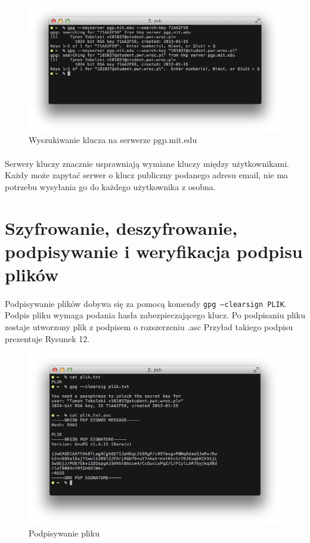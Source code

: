 \documentclass[wide,a4paper,titlepage,12pt] {article}
\begin{document}
  \begin{figure}[h!]
    \begin{center}
      \includegraphics[width=\textwidth]{img/11.png}
      \caption{Wyszukiwanie klucza na serwerze pgp.mit.edu}
    \end{center}
  \end{figure}

  \paragraph{}
  Serwery kluczy znacznie usprawniają wymiane kluczy między użytkownikami. Każdy może zapytać serwer o klucz publiczny podanego adresu email, nie ma potrzebu wysyłania go do każdego użytkownika z osobna.

  \section{Szyfrowanie, deszyfrowanie, podpisywanie i weryfikacja podpisu plików}
  \paragraph{}
  Podpisywanie plików dobywa się za pomocą komendy \texttt{gpg --clearsign PLIK}. Podpis pliku wymaga podania hasła zabezpieczającego klucz. Po podpisaniu pliku zostaje utworzony plik z podpisem o rozszerzeniu .asc  Przyład takiego podpisu prezentuje Rysunek 12.

  \begin{figure}[h!]
    \begin{center}
      \includegraphics[width=\textwidth]{img/12.png}
      \caption{Podpisywanie pliku}
    \end{center}
  \end{figure}
\end{document}
